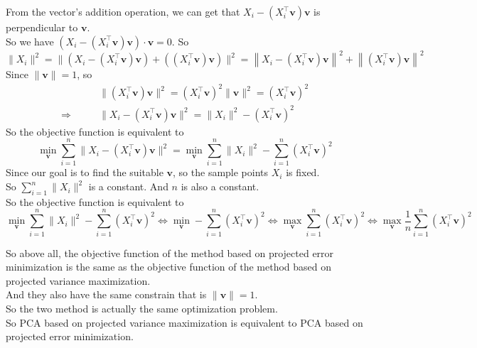 From the vector's addition operation, we can get that $X_i-\left(X_i^{\top}\mathbf{v}\right)\mathbf{v}$ is perpendicular to $\mathbf{v}$. \\
So we have $(X_i-\left(X_i^{\top}\mathbf{v}\right)\mathbf{v})\cdot \mathbf{v}=0$. So
$$\|X_i\|^2=\|\left(X_i-\left(X_i^{\top}\mathbf{v}\right)\mathbf{v}\right)+\left(\left(X_i^{\top}\mathbf{v}\right)\mathbf{v}\right)\|^2=\left\|X_i-\left(X_i^{\top}\mathbf{v}\right)\mathbf{v}\right\|^2+\left\|\left(X_i^{\top}\mathbf{v}\right)\mathbf{v}\right\|^2$$
Since $\|\mathbf{v}\|=1$, so
\begin{align*}
& \|\left(X_i^{\top}\mathbf{v}\right)\mathbf{v}\|^2=\left(X_i^{\top}\mathbf{v}\right)^2\|\mathbf{v}\|^2=\left(X_i^{\top}\mathbf{v}\right)^2 \\
\Rightarrow\qquad& \|X_i-\left(X_i^{\top}\mathbf{v}\right)\mathbf{v}\|^2=\|X_i\|^2-\left(X_i^{\top}\mathbf{v}\right)^2
\end{align*}
So the objective function is equivalent to
$$\min_{\mathbf{v}} \sum\limits_{i=1}^n \|X_i-\left(X_i^{\top}\mathbf{v}\right)\mathbf{v}\|^2=\min_{\mathbf{v}} \sum\limits_{i=1}^n \|X_i\|^2-\sum\limits_{i=1}^n\left(X_i^{\top}\mathbf{v}\right)^2$$
Since our goal is to find the suitable $\mathbf{v}$, so the sample points $X_i$ is fixed.\\
So $\sum\limits_{i=1}^n \|X_i\|^2$ is a constant. And $n$ is also a constant.\\
So the objective function is equivalent to
$$\min_{\mathbf{v}} \sum\limits_{i=1}^n \|X_i\|^2-\sum\limits_{i=1}^n\left(X_i^{\top}\mathbf{v}\right)^2\Leftrightarrow \min_{\mathbf{v}} -\sum\limits_{i=1}^n\left(X_i^{\top}\mathbf{v}\right)^2\Leftrightarrow \max_{\mathbf{v}}\sum\limits_{i=1}^n\left(X_i^{\top}\mathbf{v}\right)^2\Leftrightarrow \max_{\mathbf{v}}\dfrac{1}{n}\sum\limits_{i=1}^n\left(X_i^{\top}\mathbf{v}\right)^2 $$

So above all, the objective function of the method based on projected error minimization is the same as the objective function of the method based on projected variance maximization. \\
And they also have the same constrain that is $\|\mathbf{v}\|=1$. \\
So the two method is actually the same optimization problem. \\
So PCA based on projected variance maximization is equivalent to PCA based on projected error minimization.

\newpage